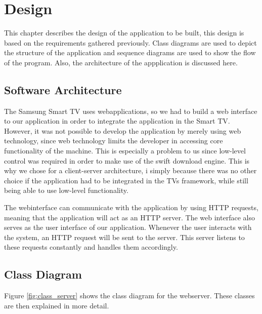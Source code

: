 \chapter{Design}
This chapter describes the design of the application to be built, this design is based on the requirements gathered previously.
Class diagrams are used to depict the structure of the application and sequence diagrams are used to show the flow of the program.
Also, the architecture of the appplication is discussed here.

\section{Software Architecture}
The Samsung Smart TV uses webapplications, so we had to build a web interface to our application in order to integrate the application in the Smart TV.
However, it was not possible to develop the application by merely using web technology, since web technology limits the developer in accessing core functionality of the machine.
This is especially a problem to us since low-level control was required in order to make use of the swift download engine. This is why we chose for a client-server architecture, i
simply because there was no other choice if the application had to be integrated in the TV\textquotesingle s framework, while still being able to use low-level functionality.

The webinterface can communicate with the application by using HTTP requests, meaning that the application will act as an HTTP server.
The web interface also serves as the user interface of our application. Whenever the user interacts with the system,
an HTTP request will be sent to the server. This server listens to these requests constantly and handles them accordingly.

\section{Class Diagram}
Figure \ref{fig:class_server} shows the class diagram for the webserver. These classes are then explained in more detail.

